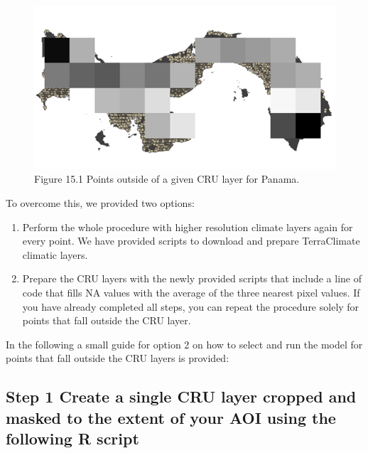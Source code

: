 \documentclass[
  10pt,
  b5paper,
]{book}
\providecommand{\tightlist}{%
  \setlength{\itemsep}{0pt}\setlength{\parskip}{0pt}}
\begin{document}
\begin{figure}
\centering
\includegraphics{images/Figure_9.7.png}
\caption{Figure 15.1 Points outside of a given CRU layer for Panama.}
\end{figure}

To overcome this, we provided two options:

\begin{enumerate}
\def\labelenumi{\arabic{enumi}.}
\tightlist
\item
  Perform the whole procedure with higher resolution climate layers again for every point. We have provided scripts to download and prepare TerraClimate climatic layers.
\item
  Prepare the CRU layers with the newly provided scripts that include a line of code that fills NA values with the average of the three nearest pixel values. If you have already completed all steps, you can repeat the procedure solely for points that fall outside the CRU layer.
\end{enumerate}

In the following a small guide for option 2 on how to select and run the model for points that fall outside the CRU layers is provided:

\hypertarget{step-1-create-a-single-cru-layer-cropped-and-masked-to-the-extent-of-your-aoi-using-the-following-r-script}{%
\subsection*{Step 1 Create a single CRU layer cropped and masked to the extent of your AOI using the following R script}\label{step-1-create-a-single-cru-layer-cropped-and-masked-to-the-extent-of-your-aoi-using-the-following-r-script}}
\end{document}
